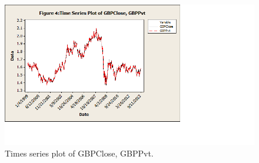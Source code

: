 	\begin{figure}[!ht]
	\centering
	\includegraphics[width=\textwidth]{chapters/chapter_uvts/figures/Sec2-4Fig4.png}
	\caption{Times series plot of GBPClose, GBPPvt. \label{fig:timegbp}}
	\end{figure}
	
	
